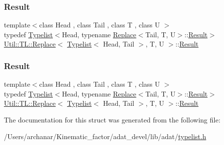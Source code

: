 \subsubsection{\texorpdfstring{Result}{Result}\hspace{0.1cm}{\footnotesize\ttfamily [1/2]}}
{\footnotesize\ttfamily template$<$class Head , class Tail , class T , class U $>$ \\
typedef \mbox{\hyperlink{structUtil_1_1Typelist}{Typelist}}$<$Head, typename \mbox{\hyperlink{structUtil_1_1TL_1_1Replace}{Replace}}$<$Tail, T, U$>$\+::\mbox{\hyperlink{structUtil_1_1TL_1_1Replace_3_01Typelist_3_01Head_00_01Tail_01_4_00_01T_00_01U_01_4_a218cadcba3503c01d97b4a6d4e65982c}{Result}}$>$ \mbox{\hyperlink{structUtil_1_1TL_1_1Replace}{Util\+::\+T\+L\+::\+Replace}}$<$ \mbox{\hyperlink{structUtil_1_1Typelist}{Typelist}}$<$ Head, Tail $>$, T, U $>$\+::\mbox{\hyperlink{structUtil_1_1TL_1_1Replace_3_01Typelist_3_01Head_00_01Tail_01_4_00_01T_00_01U_01_4_a218cadcba3503c01d97b4a6d4e65982c}{Result}}}

\mbox{\label{structUtil_1_1TL_1_1Replace_3_01Typelist_3_01Head_00_01Tail_01_4_00_01T_00_01U_01_4_a218cadcba3503c01d97b4a6d4e65982c}} 
\subsubsection{\texorpdfstring{Result}{Result}\hspace{0.1cm}{\footnotesize\ttfamily [2/2]}}
{\footnotesize\ttfamily template$<$class Head , class Tail , class T , class U $>$ \\
typedef \mbox{\hyperlink{structUtil_1_1Typelist}{Typelist}}$<$Head, typename \mbox{\hyperlink{structUtil_1_1TL_1_1Replace}{Replace}}$<$Tail, T, U$>$\+::\mbox{\hyperlink{structUtil_1_1TL_1_1Replace_3_01Typelist_3_01Head_00_01Tail_01_4_00_01T_00_01U_01_4_a218cadcba3503c01d97b4a6d4e65982c}{Result}}$>$ \mbox{\hyperlink{structUtil_1_1TL_1_1Replace}{Util\+::\+T\+L\+::\+Replace}}$<$ \mbox{\hyperlink{structUtil_1_1Typelist}{Typelist}}$<$ Head, Tail $>$, T, U $>$\+::\mbox{\hyperlink{structUtil_1_1TL_1_1Replace_3_01Typelist_3_01Head_00_01Tail_01_4_00_01T_00_01U_01_4_a218cadcba3503c01d97b4a6d4e65982c}{Result}}}



The documentation for this struct was generated from the following file\+:\begin{DoxyCompactItemize}
\item 
/\+Users/archanar/\+Kinematic\+\_\+factor/adat\+\_\+devel/lib/adat/\mbox{\hyperlink{lib_2adat_2typelist_8h}{typelist.\+h}}\end{DoxyCompactItemize}
